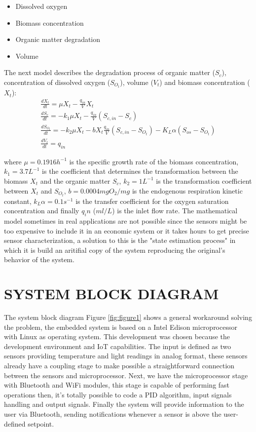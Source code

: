 \documentclass[journal]{IEEEtran}  %
\begin{document}
\begin{itemize}
	\item Dissolved oxygen
	\item Biomass concentration
	\item Organic matter degradation
	\item Volume
\end{itemize}

The next model describes the degradation process of organic matter ($S_c$), concentration of dissolved oxygen ($S_{O_{t}}$), volume ($V_{t}$) and biomass concentration ($X_t$):
\begin{equation}
{
	\begin{array}{cc}
	\frac{dX_{t}}{dt}=\mu X_{t} - \frac{q_{in}}{V}X_{t} \\
	\frac{dS_{c}}{dt}=-k_{1}\mu X_{t} - \frac{q_{in}}{V}(S_{c,in}-S_{c}) \\
	\frac{dS_{O_{t}}}{dt}=-k_{2}\mu X_{t} - b X_{t}\frac{q_{in}}{V}(S_{c,in}-S_{O_{t}})-K_{L}\alpha(S_{os}-S_{O_{t}}) \\
	\frac{dV_{t}}{dt}=q_{in}
	\end{array}}
\end{equation}

where $\mu=0.1916 h^{-1}$ is the specific growth rate of the
biomass concentration, $k_1=3.7 L^{-1}$ is the coefficient that determines the transformation between the biomass $X_{t}$ and the organic matter $S_{c}$, $k_2=1 L^{-1}$ is the transformation coefficient between $X_{t}$ and $S_{O_{t}}$, $b=0.0004 mgO_{2}/mg$ is the endogenous respiration kinetic constant, $k_{L}\alpha=0.1 s^{-1}$ is the transfer coefficient for the oxygen saturation concentration and finally $q_in$ ($ml/L$) is the inlet flow rate.
The mathematical model sometimes in real applications are not possible since the sensors might be too expensive to include it in an economic system or it takes hours to get precise sensor characterization, a solution to this is the "state estimation process" in which it is build an aritifial copy of the system reproducing the original's behavior of the system.


\section{SYSTEM BLOCK DIAGRAM}

The system block diagram Figure \ref{fig:figure1} shows a general workaround solving the problem, the embedded system is based on a Intel Edison microprocessor with Linux as operating system. This development was chosen because the development environment and IoT capabilities. The input is defined as two sensors providing temperature and light readings in analog format, these sensors already have a coupling stage to make possible a straightforward connection between the sensors and microprocessor. Next, we have the microprocessor stage with Bluetooth and WiFi modules, this stage is capable of performing fast operations then, it's totally possible to code a PID algorithm, input signals handling and output signals. Finally the system will provide information to the user via Bluetooth, sending notifications whenever a sensor is above the user-defined setpoint.
\end{document}
